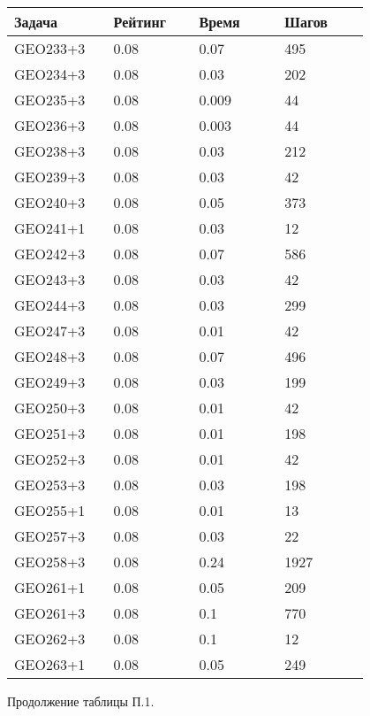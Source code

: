 \begin{longtable}[H]{|p{0.2\linewidth}|p{0.2\linewidth}|p{0.2\linewidth}|p{0.2\linewidth}|}
\hline
\textbf{Задача} & \textbf{Рейтинг} & \textbf{Время} & \textbf{Шагов} \\
\hline
GEO233+3 & 0.08 & 0.07 & 495 \\
\hline
GEO234+3 & 0.08 & 0.03 & 202 \\
\hline
GEO235+3 & 0.08 & 0.009 & 44 \\
\hline
GEO236+3 & 0.08 & 0.003 & 44 \\
\hline
GEO238+3 & 0.08 & 0.03 & 212 \\
\hline
GEO239+3 & 0.08 & 0.03 & 42 \\
\hline
GEO240+3 & 0.08 & 0.05 & 373 \\
\hline
GEO241+1 & 0.08 & 0.03 & 12 \\
\hline
GEO242+3 & 0.08 & 0.07 & 586 \\
\hline
GEO243+3 & 0.08 & 0.03 & 42 \\
\hline
GEO244+3 & 0.08 & 0.03 & 299 \\
\hline
GEO247+3 & 0.08 & 0.01 & 42 \\
\hline
GEO248+3 & 0.08 & 0.07 & 496 \\
\hline
GEO249+3 & 0.08 & 0.03 & 199 \\
\hline
GEO250+3 & 0.08 & 0.01 & 42 \\
\hline
GEO251+3 & 0.08 & 0.01 & 198 \\
\hline
GEO252+3 & 0.08 & 0.01 & 42 \\
\hline
GEO253+3 & 0.08 & 0.03 & 198 \\
\hline
GEO255+1 & 0.08 & 0.01 & 13 \\
\hline
GEO257+3 & 0.08 & 0.03 &  22 \\
\hline
GEO258+3 & 0.08 & 0.24 &  1927 \\
\hline
GEO261+1 & 0.08 & 0.05 &  209 \\
\hline
GEO261+3 & 0.08 &  0.1 &  770 \\
\hline
GEO262+3 & 0.08 &  0.1 & 12 \\
\hline
GEO263+1 & 0.08 & 0.05 &  249 \\
\hline
\end{longtable}
\begin{center}
Продолжение таблицы П.1.
\end{center}

